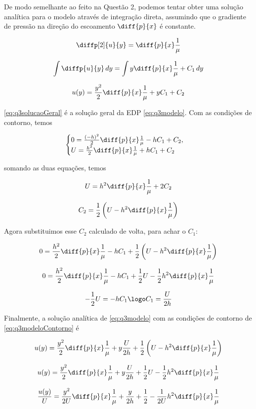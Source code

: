 De modo semelhante ao feito na Questão 2, podemos tentar obter uma solução analítica
para o modelo através de integração direta, assumindo que o gradiente de pressão 
na direção do escoamento $\diff{p}{x}$ é constante.

\[ \diffp[2]{u}{y} = \diff{p}{x} \frac{1}{\mu} \]

\[ \int \diffp{u}{y} \, dy = \int y\diff{p}{x}\frac{1}{\mu} + C_1  \, dy \]

\begin{equation}\label{eq:q3solucaoGeral}
    u(y) = \frac{y^2}{2}\diff{p}{x}\frac{1}{\mu} + yC_1 + C_2 
\end{equation}

\eqref{eq:q3solucaoGeral} é a solução geral da EDP \eqref{eq:q3modelo}. Com as condições de contorno,
temos

\[
    \begin{cases}
        0 = \frac{(-h)^2}{2}\diff{p}{x}\frac{1}{\mu} - hC_1 + C_2 , \\
        U = \frac{h^2}{2}\diff{p}{x}\frac{1}{\mu} + hC_1 + C_2 
    \end{cases} 
\]  

\noindent somando as duas equações, temos  

\[ U = h^2\diff{p}{x}\frac{1}{\mu} + 2C_2 \]

\[ C_2 = \frac{1}{2} \left(U - h^2\diff{p}{x}\frac{1}{\mu}\right)  \]

Agora substituimos esse $C_2$ calculado de volta, para achar o $C_1$:

\[ 0 = \frac{h^2}{2}\diff{p}{x}\frac{1}{\mu} - hC_1 + \frac{1}{2} \left(U - h^2\diff{p}{x}\frac{1}{\mu}\right)  \]

\[ 0 = \frac{h^2}{2}\diff{p}{x}\frac{1}{\mu} - hC_1 + \frac{1}{2}U - \frac{1}{2} h^2\diff{p}{x}\frac{1}{\mu} \]

\[ - \frac{1}{2}U = - hC_1 \logo C_1 = \frac{U}{2h} \]

Finalmente, a solução analítica de \eqref{eq:q3modelo} com as condições de contorno de 
\eqref{eq:q3modeloContorno} é

\[ u(y) = \frac{y^2}{2}\diff{p}{x}\frac{1}{\mu} + y\frac{U}{2h} + \frac{1}{2} \left(U - h^2\diff{p}{x}\frac{1}{\mu}\right)  \]

\[ u(y) = \frac{y^2}{2}\diff{p}{x}\frac{1}{\mu} + y\frac{U}{2h} + \frac{1}{2}U - \frac{1}{2} h^2\diff{p}{x}\frac{1}{\mu}  \]

\[ \frac{u(y)}{U} = \frac{y^2}{2U}\diff{p}{x}\frac{1}{\mu} + \frac{y}{2h} + \frac{1}{2} - \frac{1}{2U} h^2\diff{p}{x}\frac{1}{\mu}  \]

